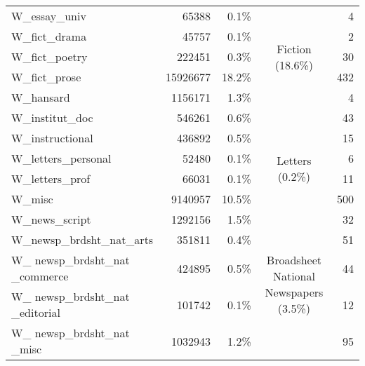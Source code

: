 {\begin{center}
\begin{tabular}{lrrcr}
        W\_essay\_univ                     & 65388    & 0.1\%   &                                                         & 4     \\ \cline{4-4}
        W\_fict\_drama                     & 45757    & 0.1\%   & \multirow{3}{*}{\parbox{2.1cm}{Fiction (18.6\%)}}                       & 2     \\
        W\_fict\_poetry                    & 222451   & 0.3\%   &                                                         & 30    \\
        W\_fict\_prose                     & 15926677 & 18.2\%  &                                                         & 432   \\ \cline{4-4}
        W\_hansard                         & 1156171  & 1.3\%   &                                                         & 4     \\
        W\_institut\_doc                   & 546261   & 0.6\%   &                                                         & 43    \\
        W\_instructional                   & 436892   & 0.5\%   &                                                         & 15    \\ \cline{4-4}
        W\_letters\_personal               & 52480    & 0.1\%   & \multirow{2}{*}{\parbox{2.1cm}{Letters (0.2\%)}}                        & 6     \\
        W\_letters\_prof                   & 66031    & 0.1\%   &                                                         & 11    \\ \cline{4-4}
        W\_misc                            & 9140957  & 10.5\%  &                                                         & 500   \\ \cline{4-4}
        W\_news\_script                    & 1292156  & 1.5\%   & \multirow{9}{*}{\parbox{2.1cm}{Broadsheet National Newspapers (3.5\%)}} & 32    \\
        W\_newsp\_brdsht\_nat\_arts        & 351811   & 0.4\%   &                                                         & 51    \\
        W\_ newsp\_brdsht\_nat \_commerce  & 424895   & 0.5\%   &                                                         & 44    \\
        W\_ newsp\_brdsht\_nat \_editorial & 101742   & 0.1\%   &                                                         & 12    \\
        W\_ newsp\_brdsht\_nat \_misc      & 1032943  & 1.2\%   &                                                         & 95    \\

\end{tabular}
\end{center}}

